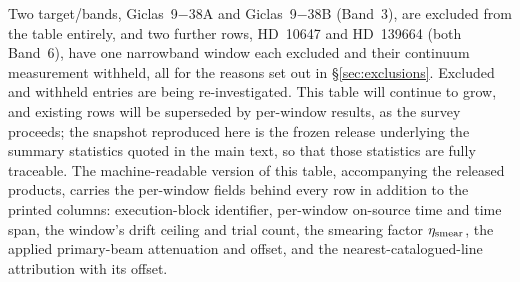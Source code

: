 \documentclass{openjournal}
\begin{document}
Two target/bands, Giclas~9$-$38A and Giclas~9$-$38B (Band~3), are
excluded from the table entirely, and two further rows, HD~10647 and
HD~139664 (both Band~6), have one narrowband window each
excluded and their continuum measurement withheld, all for the reasons
set out in \S\ref{sec:exclusions}. Excluded and withheld entries are
being re-investigated. This table will
continue to grow, and existing rows will be superseded by per-window
results, as the survey proceeds; the snapshot reproduced here is the
frozen release underlying the summary statistics quoted in the
main text, so that those statistics are fully traceable. The
machine-readable version of this table, accompanying the released products,
carries the per-window fields behind every row in addition to the
printed columns: execution-block identifier, per-window on-source time
and time span, the window's drift ceiling and trial count, the
smearing factor $\eta_{\rm smear}$, the applied primary-beam
attenuation and offset, and the nearest-catalogued-line attribution
with its offset.
\end{document}
